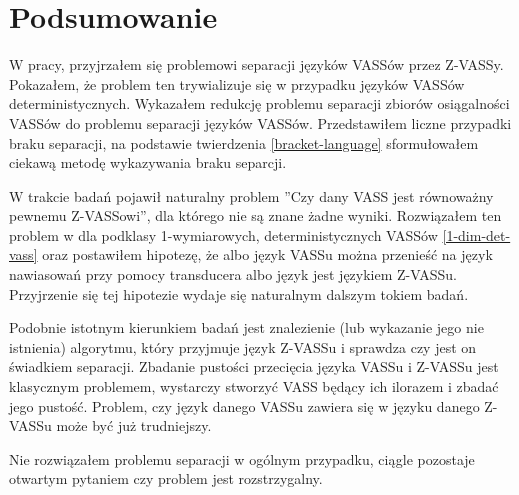 \documentclass[magisterska]{pracamgr}
\begin{document}


    \chapter{Podsumowanie}
    W pracy, przyjrzałem się problemowi separacji języków VASSów przez Z-VASSy.
    Pokazałem, że problem ten trywializuje się w przypadku języków VASSów deterministycznych.
    Wykazałem redukcję problemu separacji zbiorów osiągalności VASSów \cite{reach_sep_jerome} do problemu separacji języków VASSów.
    Przedstawiłem liczne przypadki braku separacji, na podstawie twierdzenia \ref{bracket-language}
    sformułowałem ciekawą metodę wykazywania braku separcji.

    W trakcie badań pojawił naturalny problem ''Czy dany VASS jest równoważny pewnemu Z-VASSowi'', dla którego nie są znane
    żadne wyniki.
    Rozwiązałem ten problem w dla podklasy 1-wymiarowych, deterministycznych VASSów \ref{1-dim-det-vass} oraz postawiłem hipotezę,
    że albo język VASSu można przenieść na język nawiasowań przy pomocy transducera albo język jest językiem Z-VASSu.
    Przyjrzenie się tej hipotezie wydaje się naturalnym dalszym tokiem badań.

    Podobnie istotnym kierunkiem badań jest znalezienie (lub wykazanie jego nie istnienia) algorytmu, który przyjmuje
    język Z-VASSu i sprawdza czy jest on świadkiem separacji.
    Zbadanie pustości przecięcia języka VASSu i Z-VASSu jest klasycznym problemem, wystarczy stworzyć VASS będący ich ilorazem i zbadać jego pustość.
    Problem, czy język danego VASSu zawiera się w języku danego Z-VASSu może być już trudniejszy.

    Nie rozwiązałem problemu separacji w ogólnym przypadku, ciągle pozostaje otwartym pytaniem czy problem jest rozstrzygalny.
\end{document}

